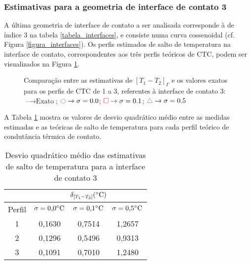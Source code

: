 \subsubsection{Estimativas para a geometria de interface de contato 3}

A última geometria de interface de contato a ser analisada corresponde à de índice 3 na tabela \ref{tabela_interfaces}, e consiste numa curva cossenoidal (cf. Figura \ref{figura_interfaces}).  Os perfis estimados de salto de temperatura na interface de contato, correspondentes aos três perfis teóricos de CTC, podem ser visualizados na Figura \ref{figura_delta_temperaturas_interface_03}.

\begin{figure}[H]
	\caption{Comparação entre as estimativas de $[T_1 - T_2]_\Gamma$ e os valores exatos para os perfis de CTC de 1 a 3, referentes à interface de contato 3: $\text{--} \rightarrow \text{Exato}$; $\textcolor{blue}{\ocircle} \rightarrow \sigma = 0.0$; $\textcolor{red}{\square} \rightarrow \sigma = 0.1$; $\textcolor{gray}{\triangle} \rightarrow \sigma = 0.5$}
	\label{figura_delta_temperaturas_interface_03}
\end{figure}

A Tabela \ref{tabela_rms_delta_temperaturas_interface_3} mostra os valores de desvio quadrático médio entre as medidas estimadas e as teóricas de salto de temperatura para cada perfil teórico de condutância térmica de contato.
\begin{table}[H]
	\centering
	\caption{Desvio quadrático médio das estimativas de salto de temperatura para a interface de contato 3}
	\begin{tabular}{c|c|c|c|}
		\cline{2-4}
		& \multicolumn{3}{c|}{$\delta_{[T_1 - T_2]} (\celsius)$} \\ \hline
		\multicolumn{1}{|c|}{Perfil} & $\sigma = \text{0,0}\celsius$   & $\sigma = \text{0,1}\celsius$    & $\sigma = \text{0,5}\celsius$  \\ \hline
		\multicolumn{1}{|c|}{1}      & 0,1630       & 0,7514       & 1,2657      \\ \hline
		\multicolumn{1}{|c|}{2}      & 0,1296       & 0,5496       & 0,9313      \\ \hline
		\multicolumn{1}{|c|}{3}      & 0,1091       & 0,7010       & 1,2480      \\ \hline
	\end{tabular}
	\label{tabela_rms_delta_temperaturas_interface_3}
\end{table}

